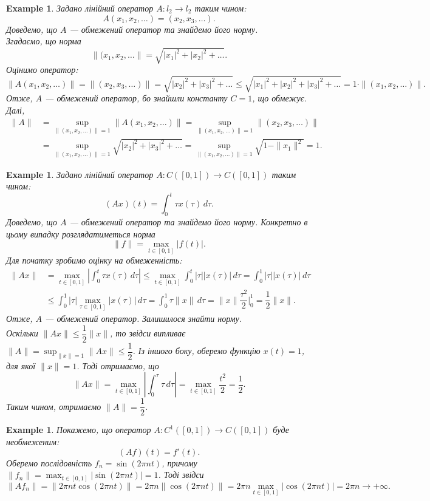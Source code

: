 \documentclass[a4paper, 10pt]{article}
\theoremstyle{theoremdd}
\theoremstyle{theoremdd}
\theoremstyle{theoremdd}
\theoremstyle{theoremdd}
\newtheorem{example}[theorem]{Example}
\theoremstyle{theoremdd}
\theoremstyle{theoremdd}
\theoremstyle{theoremdd}
\theoremstyle{theoremdd}
\begin{document}
\begin{example}
Задано лінійний оператор $A \colon l_2 \to l_2$ таким чином: 
\[
A(x_1,x_2,\dots) = (x_2,x_3,\dots).
\]
Доведемо, що $A$ --- обмежений оператор та знайдемо його норму.\\
Згадаємо, що норма 
\[
\|(x_1,x_2,\dots\| = \sqrt{|x_1|^2 + |x_2|^2 + \dots}.
\]
Оцінимо оператор:
\[
\|A (x_1,x_2,\dots)\| = \|(x_2,x_3,\dots)\| = \sqrt{|x_2|^2 + |x_3|^2 + \dots} \leq \sqrt{|x_1|^2 + |x_2|^2 + |x_3|^2 + \dots} = 1 \cdot \|(x_1,x_2,\dots)\|.
\]
Отже, $A$ --- обмежений оператор, бо знайшли константу $C = 1$, що обмежує. Далі,
\begin{align*}
\|A\| & = \displaystyle\sup_{\|(x_1,x_2,\dots)\| = 1} \|A(x_1,x_2,\dots)\| = \displaystyle\sup_{\|(x_1,x_2,\dots)\| = 1} \|(x_2,x_3,\dots)\| \\
& = \sup_{\|(x_1,x_2,\dots)\| = 1} \sqrt{|x_2|^2 + |x_3|^2 + \dots} = \sup_{\|(x_1,x_2,\dots)\| = 1} \sqrt{1 - \|x_1\|^2} = 1.
\end{align*}
\end{example}

\begin{example}
Задано лінійний оператор $A \colon C([0,1]) \to C([0,1])$ таким чином: 
\[
(Ax)(t) = \displaystyle\int_0^t \tau x(\tau)\,d\tau.
\]
Доведемо, що $A$ --- обмежений оператор та знайдемо його норму. Конкретно в цьому випадку розглядатиметься норма 
\[
\|f\| = \displaystyle\max_{t \in [0,1]} |f(t)|.
\]
Для початку зробимо оцінку на обмеженність:
\begin{align*}
\|Ax\| & = \max_{t \in [0,1]} \left| \int_0^t \tau x(\tau)\,d\tau \right| \leq \max_{t \in [0,1]} \int_0^t |\tau| |x(\tau)|\,d\tau = \int_0^1 |\tau| |x(\tau)|\,d\tau \\
& \leq \int_0^1 |\tau| \max_{\tau \in [0,1]} |x(\tau)|\,d\tau = \int_0^1 \tau \|x \|\,d\tau = \|x\| \dfrac{\tau^2}{2} \Big|_0^1 = \dfrac{1}{2} \|x\|.
\end{align*}
Отже, $A$ --- обмежений оператор. Залишилося знайти норму.\\
Оскільки $\|Ax\| \leq \dfrac{1}{2} \|x\|$, то звідси випливає $\|A\| = \displaystyle\sup_{\|x\| = 1} \|Ax\| \leq \dfrac{1}{2}$. Із іншого боку, оберемо функцію $x(t) = 1$, для якої $\|x\| = 1$. Тоді отримаємо, що 
\[
\|Ax\| = \displaystyle\max_{t \in [0,1]} \left|\int_0^\tau \tau\,d\tau\right| = \max_{t \in [0,1]} \dfrac{t^2}{2} = \dfrac{1}{2}.
\]
Таким чином, отримаємо $\|A\| = \dfrac{1}{2}$.
\end{example}

\begin{example}
Покажемо, що оператор $A \colon C^1([0,1]) \to C([0,1])$ буде необмеженим:
\[
(Af)(t) = f'(t).
\]
Оберемо послідовність $f_n = \sin (2\pi n t)$, причому $\|f_n\| = \displaystyle\max_{t \in [0,1]} |\sin (2\pi n t)| = 1$. Тоді звідси
\[
\|Af_n\| = \displaystyle \| 2\pi n t \cos (2\pi n t)\| = 2 \pi n \| \cos (2\pi n t)\| = 2 \pi n \max_{t \in [0,1]} |\cos (2\pi n t)| = 2 \pi n \to +\infty.
\]
\end{example}
\end{document}

